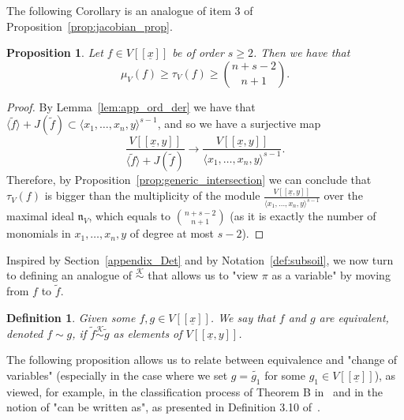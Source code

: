 \documentclass{article}
\newtheorem{definition}[theorem]{Definition}
\newtheorem{proposition}[theorem]{Proposition}
\newcommand{\equivk}{\overset{\mathcal{K}}{\sim}}
\newcommand{\naxV}{\mathfrak{n}_V}
\newcommand{\Vx}{V[[\underline{x}]]}
\newcommand{\Vxy}{V[[\underline{x},y]]}
\numberwithin{theorem}{section}
\begin{document}
The following Corollary is an analogue of item 3 of Proposition~\ref{prop:jacobian_prop}. 

\begin{proposition}\label{cor:tjurina_bound}
    Let $f \in \Vx$ be of order $s \geq 2$. Then we have that
    \begin{equation*}
        \mu_V\left(f\right) \geq \tau_V\left(f\right) \geq \binom{n+s-2}{n+1}.
    \end{equation*}
\end{proposition}

\begin{proof}
By Lemma~\ref{lem:app_ord_der} we have that $\langle \tilde{f} \rangle+J(\tilde{f}) \subset \langle x_1, \dots, x_n, y \rangle^{s-1}$, and so we have a surjective map 
\begin{equation*}
   \frac{\Vxy}{\langle \tilde{f} \rangle+J(\tilde{f})} \to   \frac{\Vxy}{\langle x_1, \dots, x_n, y \rangle^{s-1}}.  
\end{equation*}
 Therefore, by Proposition~\ref{prop:generic_intersection} we can conclude that $\tau_V\left(f\right)$ is bigger than the multiplicity of the module $\frac{\Vxy}{\langle x_1, \dots, x_n, y \rangle^{s-1}}$ over the maximal ideal $\naxV$, which equals to $\binom{n+s-2}{n+1}$ (as it is exactly the number of monomials in $x_1, \dots, x_n, y$ of degree at most $s-2$).    
\end{proof}

Inspired by Section~\ref{appendix_Det} and by Notation~\ref{def:subsoil}, we now turn to defining an analogue of $\equivk$ that allows us to "view $\pi$ as a variable" by moving from $f$ to $\tilde{f}$.


\begin{definition}\label{def:equiv}
Given some $f,g \in \Vx$. We say that $f$ and $g$ are equivalent, denoted $f \sim g$, if $\tilde{f} \equivk \tilde{g}$ as elements of $\Vxy$. 
\end{definition}


The following proposition allows us to relate between equivalence and "change of variables" (especially in the case where we set $g=\tilde{g_1}$ for some $g_1 \in \Vx$), as viewed, for example, in the classification process of Theorem B in~\cite{carvajal2019covers} and in the notion of "can be written as", as presented in Definition 3.10 of~\cite{svoray2025ade}. 
\end{document}
